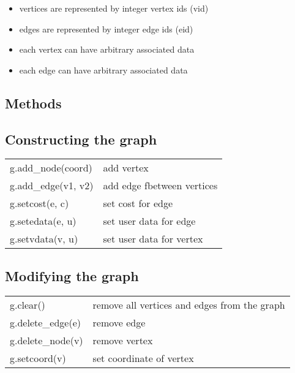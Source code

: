 \begin{itemize}
  \item vertices are represented by integer vertex ids (vid)
  \item edges are represented by integer edge ids (eid)
  \item each vertex can have arbitrary associated data
  \item each edge can have arbitrary associated data
\end{itemize}

\subsection*{Methods}

\subsection*{Constructing the graph}
\begin{longtable}{lp{120mm}}
g.add\_node(coord) & add vertex\\ 
g.add\_edge(v1, v2) & add edge fbetween vertices\\ 
g.setcost(e, c) & set cost for edge\\ 
g.setedata(e, u) & set user data for edge\\ 
g.setvdata(v, u) & set user data for vertex\\ 
\end{longtable}\vspace{1ex}

\subsection*{Modifying the graph}
\begin{longtable}{lp{120mm}}
g.clear() & remove all vertices and edges from the graph\\ 
g.delete\_edge(e) & remove edge\\ 
g.delete\_node(v) & remove vertex\\ 
g.setcoord(v) & set coordinate of vertex\\ 
\end{longtable}\vspace{1ex}


